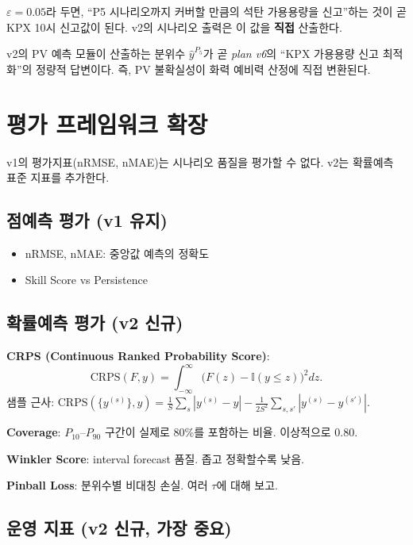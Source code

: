 \documentclass[11pt,a4paper]{article}
\begin{document}
$\varepsilon=0.05$라 두면, ``P5 시나리오까지 커버할 만큼의 석탄 가용용량을 신고''하는 것이 곧 KPX 10시 신고값이 된다. v2의 시나리오 출력은 이 값을 \textbf{직접} 산출한다.

\begin{keybox}[핵심 연계]
v2의 PV 예측 모듈이 산출하는 분위수 $\hat y^{P_5}$가 곧 \textit{plan v6}의 ``KPX 가용용량 신고 최적화''의 정량적 답변이다. 즉, PV 불확실성이 화력 예비력 산정에 직접 변환된다.
\end{keybox}

\section{평가 프레임워크 확장}

v1의 평가지표(nRMSE, nMAE)는 시나리오 품질을 평가할 수 없다. v2는 확률예측 표준 지표를 추가한다.

\subsection{점예측 평가 (v1 유지)}
\begin{itemize}[leftmargin=2em]
    \item nRMSE, nMAE: 중앙값 예측의 정확도
    \item Skill Score vs Persistence
\end{itemize}

\subsection{확률예측 평가 (v2 신규)}

\textbf{CRPS (Continuous Ranked Probability Score)}:
\begin{equation}
    \mathrm{CRPS}(F,y) = \int_{-\infty}^{\infty}\bigl(F(z) - \mathbb{I}(y\le z)\bigr)^2 dz.
\end{equation}
샘플 근사: $\mathrm{CRPS}(\{y^{(s)}\},y) = \frac{1}{S}\sum_s|y^{(s)}-y| - \frac{1}{2S^2}\sum_{s,s'}|y^{(s)}-y^{(s')}|$.

\textbf{Coverage}: $P_{10}$--$P_{90}$ 구간이 실제로 80\%를 포함하는 비율. 이상적으로 0.80.

\textbf{Winkler Score}: interval forecast 품질. 좁고 정확할수록 낮음.

\textbf{Pinball Loss}: 분위수별 비대칭 손실. 여러 $\tau$에 대해 보고.

\subsection{운영 지표 (v2 신규, 가장 중요)}
\end{document}
